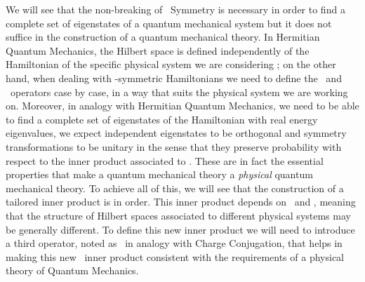         We will see that the non-breaking of \PT\ Symmetry is necessary in order to find a complete set of eigenstates of a quantum mechanical system but it does not suffice in the construction of a quantum mechanical theory. In Hermitian Quantum Mechanics, the Hilbert space is defined independently of the Hamiltonian of the specific physical system we are considering \cite{bender2024}; on the other hand, when dealing with \PT-symmetric Hamiltonians we need to define the \hP\ and \hT\ operators case by case, in a way that suits the physical system we are working on. Moreover, in analogy with Hermitian Quantum Mechanics, we need to be able to find a complete set of eigenstates of the Hamiltonian with real energy eigenvalues, we expect independent eigenstates to be orthogonal and symmetry transformations to be unitary in the sense that they preserve probability with respect to the inner product associated to \hPT. These are in fact the essential properties that make a quantum mechanical theory a \emph{physical} quantum mechanical theory. To achieve all of this, we will see that the construction of a tailored inner product is in order. This inner product depends on \hP\ and \hT, meaning that the structure of Hilbert spaces associated to different physical systems may be generally different. To define this new inner product we will need to introduce a third operator, noted as \hC\ in analogy with Charge Conjugation, that helps in making this new \CPT\ inner product consistent with the requirements of a physical theory of Quantum Mechanics.


